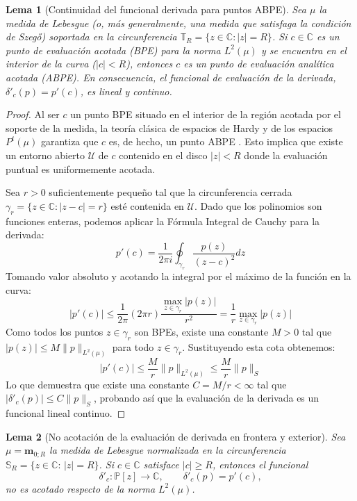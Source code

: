 \documentclass[12pt,a4paper]{article}
\newtheorem{lemma}{Lema}
\theoremstyle{definition}
\theoremstyle{remark}
\newcommand{\C}{\mathbb{C}}
\newcommand{\Poly}{\mathbb{P}[z]}
\begin{document}
\begin{lemma}[Continuidad del funcional derivada para puntos ABPE]
  \label{lema:ABPE_derivada}
  Sea $\mu$ la medida de Lebesgue (o, más generalmente, una medida que satisfaga la condición de Szegő) soportada en la circunferencia $\mathbb{T}_R = \{z \in \mathbb{C} : |z| = R\}$. Si $c \in \mathbb{C}$ es un punto de evaluación acotada (BPE) para la norma $L^2(\mu)$ y se encuentra en el interior de la curva ($|c| < R$), entonces $c$ es un punto de evaluación analítica acotada (ABPE). En consecuencia, el funcional de evaluación de la derivada, $\delta'_c(p) = p'(c)$, es lineal y continuo.
\end{lemma}

\begin{proof}
  Al ser $c$ un punto BPE situado en el interior de la región acotada por el soporte de la medida, la teoría clásica de espacios de Hardy y de los espacios $P^t(\mu)$ garantiza que $c$ es, de hecho, un punto ABPE \cite{miller1999bounded,aleman2009nontangential}. Esto implica que existe un entorno abierto $\mathcal{U}$ de $c$ contenido en el disco $|z| < R$ donde la evaluación puntual es uniformemente acotada.

  Sea $r > 0$ suficientemente pequeño tal que la circunferencia cerrada $\gamma_r = \{z \in \mathbb{C} : |z-c| = r\}$ esté contenida en $\mathcal{U}$. Dado que los polinomios son funciones enteras, podemos aplicar la Fórmula Integral de Cauchy para la derivada:
  \[
    p'(c) = \frac{1}{2\pi i} \oint_{\gamma_r} \frac{p(z)}{(z-c)^2} dz
  \]
  Tomando valor absoluto y acotando la integral por el máximo de la función en la curva:
  \[
    |p'(c)| \le \frac{1}{2\pi} \left( 2\pi r \right) \frac{\max_{z \in \gamma_r} |p(z)|}{r^2} = \frac{1}{r} \max_{z \in \gamma_r} |p(z)|
  \]
  Como todos los puntos $z \in \gamma_r$ son BPEs, existe una constante $M > 0$ tal que $|p(z)| \le M \|p\|_{L^2(\mu)}$ para todo $z \in \gamma_r$. Sustituyendo esta cota obtenemos:
  \[
    |p'(c)| \le \frac{M}{r} \|p\|_{L^2(\mu)} \le \frac{M}{r} \|p\|_S
  \]
  Lo que demuestra que existe una constante $C = M/r < \infty$ tal que $|\delta'_c(p)| \le C \|p\|_S$, probando así que la evaluación de la derivada es un funcional lineal continuo.
\end{proof}

\begin{lemma}[No acotación de la evaluación de derivada en frontera y exterior]
  \label{lem:no_acotacion_derivada_exterior_lebesgue}
  Sea $\mu=\mathbf m_{0;R}$ la medida de Lebesgue normalizada en la circunferencia
  $\mathbb{S}_R=\{z\in\C:\,|z|=R\}$. Si $c\in\C$ satisface $|c|\ge R$, entonces el funcional
  \[
    \delta'_c:\Poly\to\C,
    \qquad
    \delta'_c(p)=p'(c),
  \]
  no es acotado respecto de la norma $L^2(\mu)$.
\end{lemma}
\end{document}
